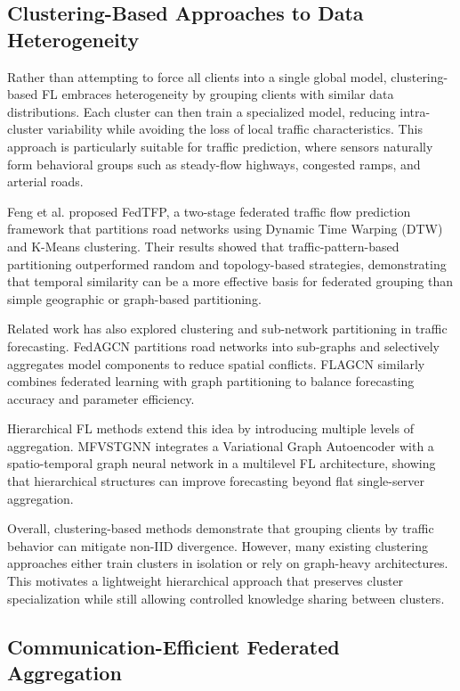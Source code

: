 \subsection{Clustering-Based Approaches to Data Heterogeneity}
\label{sec:clustering}

Rather than attempting to force all clients into a single global model, clustering-based FL embraces heterogeneity by grouping clients with similar data distributions. Each cluster can then train a specialized model, reducing intra-cluster variability while avoiding the loss of local traffic characteristics. This approach is particularly suitable for traffic prediction, where sensors naturally form behavioral groups such as steady-flow highways, congested ramps, and arterial roads.

Feng et al. \cite{feng2024} proposed FedTFP, a two-stage federated traffic flow prediction framework that partitions road networks using Dynamic Time Warping (DTW) and K-Means clustering. Their results showed that traffic-pattern-based partitioning outperformed random and topology-based strategies, demonstrating that temporal similarity can be a more effective basis for federated grouping than simple geographic or graph-based partitioning.

Related work has also explored clustering and sub-network partitioning in traffic forecasting. FedAGCN \cite{qi2023fedagcn} partitions road networks into sub-graphs and selectively aggregates model components to reduce spatial conflicts. FLAGCN \cite{yaqub2025flagcn} similarly combines federated learning with graph partitioning to balance forecasting accuracy and parameter efficiency.

Hierarchical FL methods extend this idea by introducing multiple levels of aggregation. MFVSTGNN \cite{liu2023mfvstgnn} integrates a Variational Graph Autoencoder with a spatio-temporal graph neural network in a multilevel FL architecture, showing that hierarchical structures can improve forecasting beyond flat single-server aggregation.

Overall, clustering-based methods demonstrate that grouping clients by traffic behavior can mitigate non-IID divergence. However, many existing clustering approaches either train clusters in isolation or rely on graph-heavy architectures. This motivates a lightweight hierarchical approach that preserves cluster specialization while still allowing controlled knowledge sharing between clusters.

\subsection{Communication-Efficient Federated Aggregation}

